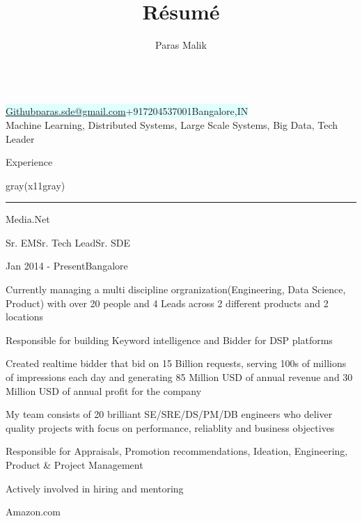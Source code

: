 \documentclass[8pt,a4paper]{article}
\makeatletter
\renewcommand{\maketitle}{
\begin{center}
{\Huge \bfseries
\theauthor} \vspace{.25em} \\
\colorbox{lightcyan}{
\href{http://github.com/i-plusplus}{Github}{\textbar}\href{mailto:paras.sde@gmail.com}{paras.sde@gmail.com}{\textbar}+917204537001{\textbar}Bangalore,IN
} 
\\
\normalsize{Machine Learning, Distributed Systems, Large Scale Systems, Big Data, Tech Leader}

\vspace{.5em}
\end{center}
}
\makeatother
\begin{document}
\title{R\'esum\'e}
\author{Paras Malik}
\maketitle
\begin{multicols}{2}
\setlength{\columnseprule}{0.4pt}
\begin{section}{Experience}
\end{section}
\begin{color}{gray(x11gray)}\hrule\end{color}
\vspace{5mm}
\begin{expsec}{Media.Net}
\end{expsec}
\begin{expsubsec}{Sr. EM{\textbar}Sr. Tech Lead{\textbar}Sr. SDE}
\end{expsubsec}
\begin{timeandlocation}Jan 2014 - Present{\textbar}Bangalore
\end{timeandlocation}
\begin{desc}{Currently managing a multi discipline orgranization(Engineering, Data Science, Product) with over 20 people and 4 Leads across 2 different products and 2 locations}
\end{desc}
\begin{desc}{Responsible for building Keyword intelligence and Bidder for DSP platforms}
\end{desc}
\begin{desc}{Created realtime bidder that bid on 15 Billion requests, serving 100s of millions of impressions each day and generating 85 Million USD of annual revenue and 30 Million USD of annual profit for the company}
\end{desc}
\begin{desc}{My team consists of 20 brilliant SE/SRE/DS/PM/DB engineers who deliver quality projects with focus on performance, reliablity and business objectives}
\end{desc}
\begin{desc}{Responsible for Appraisals, Promotion recommendations, Ideation, Engineering, Product \& Project Management}
\end{desc}
\begin{desc}{Actively involved in hiring and mentoring}
\end{desc}
\begin{expsec}{Amazon.com}
\end{expsec}

\end{multicols}
\end{document}
